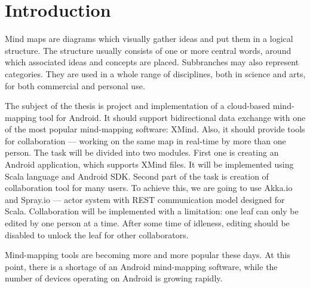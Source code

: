 %
%
%
%
%

\chapter{Introduction}
\label{chap:introduction}


Mind maps are diagrams which visually gather ideas and put them in a logical structure. The structure usually consists of one or more central words, around which associated ideas and concepts are placed. Subbranches may also represent categories. They are used in a whole range of disciplines, both in science and arts, for both commercial and personal use. \cite{Gee:2010:Roots}


The subject of the thesis is project and implementation of a cloud-based mind-mapping tool for Android. It should support bidirectional data exchange with one of the most popular mind-mapping software: XMind. Also, it should provide tools for collaboration --- working on the same map in real-time by more than one person. The task will be divided into two modules. First one is creating an Android application, which supports XMind files. It will be implemented using Scala language and Android SDK. Second part of the task is creation of collaboration tool for many users. To achieve this, we are going to use Akka.io and Spray.io --- actor system with REST communication model designed for Scala. Collaboration will be implemented with a limitation: one leaf can only be edited by one person at a time. After some time of idleness, editing should be disabled to unlock the leaf for other collaborators.


Mind-mapping tools are becoming more and more popular these days. At this point, there is a shortage of an Android mind-mapping software, while the number of devices operating on Android is growing rapidly.

